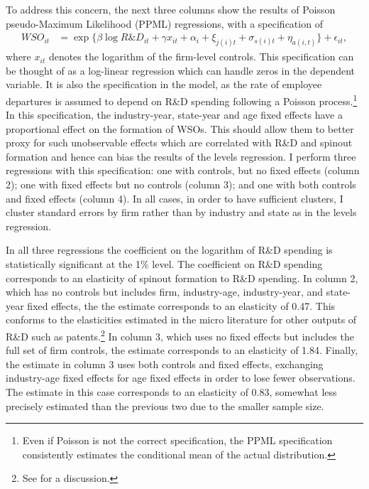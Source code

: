 \documentclass[ecta,nameyear,final]{econsocart}
\theoremstyle{plain}
\theoremstyle{remark}
\begin{document}
To address this concern, the next three columns show the results of Poisson pseudo-Maximum Likelihood (PPML) regressions, with a specification of 
\begin{align}
	WSO_{it} &= \exp \Big\{ \beta \log R\&D_{it} + \gamma x_{it} + \alpha_{i} + \xi_{j(i)t} + \sigma_{s(i)t} + \eta_{a(i,t)} \Big\} + \epsilon_{it},
\end{align}
where $x_{it}$ denotes the logarithm of the firm-level controls. This specification can be thought of as a log-linear regression which can handle zeros in the dependent variable. It is also the specification in the model, as the rate of employee departures is assumed to depend on R\&D spending following a Poisson process.\footnote{Even if Poisson is not the correct specification, the PPML specification consistently estimates the conditional mean of the actual distribution.} In this specification, the industry-year, state-year and age fixed effects have a proportional effect on the formation of WSOs. This should allow them to better proxy for such unobservable effects which are correlated with R\&D and spinout formation and hence can bias the results of the levels regression. I perform three regressions with this specification: one with controls, but no fixed effects (column 2); one with fixed effects but no controls (column 3); and one with both controls and fixed effects (column 4). In all cases, in order to have sufficient clusters, I cluster standard errors by firm rather than by industry and state as in the levels regression.

In all three regressions the coefficient on the logarithm of R\&D spending is statistically significant at the 1\% level. The coefficient on R\&D spending corresponds to an elasticity of spinout formation to R\&D spending. In column 2, which has no controls but includes firm, industry-age, industry-year, and state-year fixed effects, the the estimate corresponds to an elasticity of 0.47. This conforms to the elasticities estimated in the micro literature for other outputs of R\&D such as patents.\footnote{See \cite{akcigit_growth_2018} for a discussion.} In column 3, which uses no fixed effects but includes the full set of firm controls, the estimate corresponds to an elasticity of 1.84. Finally, the estimate in column 3 uses both controls and fixed effects, exchanging industry-age fixed effects for age fixed effects in order to lose fewer observations. The estimate in this case corresponds to an elasticity of 0.83, somewhat less precisely estimated than the previous two due to the smaller sample size.
\end{document}
